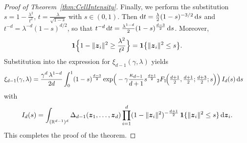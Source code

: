 \documentclass[11pt,a4paper]{article}
\theoremstyle{plain}
\theoremstyle{definition}
\theoremstyle{remark}
\newcommand{\dint}{\textup{d}}
\newcommand{\bz}{\boldsymbol{z}}
\def\RR{\mathbb{R}}
\begin{document}
\begin{proof}[Proof of Theorem~\ref{thm:CellIntensity}]
	Finally, we perform the substitution $s=1-\frac{\lambda^2}{t^2}$, $t=\frac{\lambda}{\sqrt{1-s}}$ with $s\in(0,1)$.
	Then $\dint t=\frac{\lambda}{2}(1-s)^{-3/2}\,\dint s$ and $t^{-d}=\lambda^{-d}(1-s)^{d/2}$,
	so that $t^{-d}\,\dint t=\frac{\lambda^{1-d}}{2}(1-s)^{\frac{d-3}{2}}\,\dint s$.
	Moreover,
	\[
		{\bf 1}\Big\{1-\|\bz_i\|^2\ge \frac{\lambda^2}{t^2}\Big\}
		={\bf 1}\big\{\|\bz_i\|^2\le s\big\}.
	\]
	Substitution into the expression for $\xi_{d-1}(\gamma,\lambda)$ yields
	\begin{align*}
		\xi_{d-1}(\gamma,\lambda)
		 & =\frac{\gamma^d\,\lambda^{1-d}}{2d}
		\int_0^1 (1-s)^{\frac{d-3}{2}}
		\exp\!\Big(
		-\gamma\frac{\kappa_{d-1}}{d+1}
		s^{\frac{d+1}{2}}
		{}_2F_1\!\Big(\tfrac{d+1}{2},\tfrac{d+1}{2};\tfrac{d+3}{2};s\Big)
		\Big)\,I_d(s)\,\dint s
	\end{align*}
	with
	$$
		I_d(s) = 	\int_{(\RR^{d-1})^d}
		\Delta_{d-1}(\bz_1,\ldots,\bz_d)
		\prod_{i=1}^d(1-\|\bz_i\|^2)^{-\frac{d+1}{2}}
		\,{\bf 1}\{\|\bz_i\|^2\le s\}
		\,\dint\bz_i.
	$$
	This completes the proof of the theorem.
\end{proof}
\end{document}
